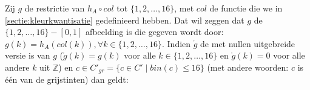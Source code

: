 Zij $g$ de restrictie van $h_A \circ col$ tot
$\{1,2,\ldots,16\}$, met $col$ de functie die we in \ref{sectie:kleurkwantisatie} gedefinieerd 
hebben. Dat wil zeggen dat $g$ de $\{1,2,\ldots,16\} - [0,1]$ afbeelding is die 
gegeven wordt door:
$g(k)=h_A(col(k)), \forall k \in \{1,2,\ldots,16\}$.
Indien $\mathring{g}$ de met nullen uitgebreide versie is van $g$ ($\mathring{g}(k)=g(k)$ voor
alle $k \in \{1,2,\ldots,16\}$ en $\mathring{g}(k)=0$ voor alle andere $k$ uit $\mathbb{Z}$)
en $c \in C'_{gr}=\{c \in C' \mid bin(c) \le 16\}$ (met
andere woorden: $c$ is \'e\'en van de grijstinten) dan geldt:
